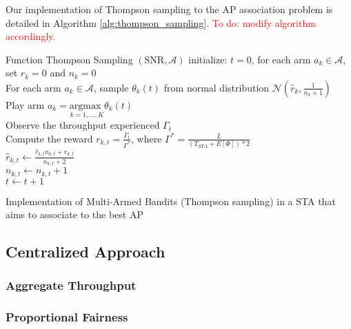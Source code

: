 \documentclass{article}
\begin{document}
			Our implementation of Thompson sampling to the AP association problem is detailed in Algorithm \ref{alg:thompson_sampling}.
			\textcolor{red}{To do: modify algorithm accordingly.}	
			\begin{algorithm}[h!]
				Function Thompson Sampling $(\text{SNR},\mathcal{A})$\;
				initialize: $t=0$,  for each arm $a_k \in \mathcal{A}$, set $\hat{r}_{k} = 0$ and $n_k = 0$ \\
				{
					For each arm $a_k \in \mathcal{A}$, sample $\theta_k(t)$ from normal distribution $\mathcal{N}(\hat{r}_{k}, \frac{1}{n_k + 1})$ \\
					Play arm $a_{k} = \underset{k=1,...,K}{\text{argmax }} \theta_k(t) $ \\
					Observe the throughput experienced $\Gamma_t$\\			
					Compute the reward $r_{k,t} = \frac{\Gamma_t}{\Gamma^*}$, where $\Gamma^* = \frac{L}{(T_{STA}+E[\Phi])*2}$ \\
					$ \hat{r}_{k,t} \leftarrow \frac{\hat{r}_{k,t}  n_{k,t} + r_{k,t}}{n_{k,t} + 2}$\\
					$n_{k,t} \leftarrow n_{k,t} + 1$\\
					$t \leftarrow t + 1$
				}
				\caption{Implementation of Multi-Armed Bandits (Thompson sampling) in a STA that aims to associate to the best AP}
				\label{alg:thompson_sampling}
			\end{algorithm}	
			
	\subsection{Centralized Approach}
	\label{section:centralized}
	
		\subsubsection{Aggregate Throughput}
		\label{section:aggregate_throughput}
		
		\subsubsection{Proportional Fairness}
		\label{section:prop_fairness}
		
\end{document}
